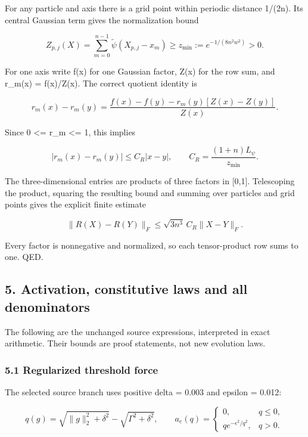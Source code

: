 \documentclass[11pt,a4paper]{article}
\begin{document}
For any particle and axis there is a grid point within periodic distance 1/(2n). Its central Gaussian term gives the normalization bound



\[
Z_{p,j}(X)=\sum_{m=0}^{n-1}\widetilde\psi(X_{p,j}-x_m)
\ge z_{\min}:=e^{-1/(8n^2w^2)}>0.
\]



For one axis write f(x) for one Gaussian factor, Z(x) for the row sum, and r\_m(x) = f(x)/Z(x). The correct quotient identity is



\[
r_m(x)-r_m(y)
=\frac{f(x)-f(y)-r_m(y)[Z(x)-Z(y)]}{Z(x)}.
\]



Since 0 <= r\_m <= 1, this implies



\[
|r_m(x)-r_m(y)|\le C_R|x-y|,
\qquad C_R=\frac{(1+n)L_\psi}{z_{\min}}.
\]



The three-dimensional entries are products of three factors in [0,1]. Telescoping the product, squaring the resulting bound and summing over particles and grid points gives the explicit finite estimate



\[
\|R(X)-R(Y)\|_F\le\sqrt{3n^3}\,C_R\|X-Y\|_F.
\]



Every factor is nonnegative and normalized, so each tensor-product row sums to one. QED.

\subsection*{5. Activation, constitutive laws and all denominators}

The following are the unchanged source expressions, interpreted in exact arithmetic. Their bounds are proof statements, not new evolution laws.

\subsubsection*{5.1 Regularized threshold force}

The selected source branch uses positive delta = 0.003 and epsilon = 0.012:



\[
q(g)=\sqrt{\|g\|_2^2+\delta^2}-\sqrt{\Gamma^2+\delta^2},
\qquad
a_e(q)=\begin{cases}0,&q\le0,\\q e^{-\epsilon^2/q^2},&q>0.\end{cases}
\]
\end{document}
